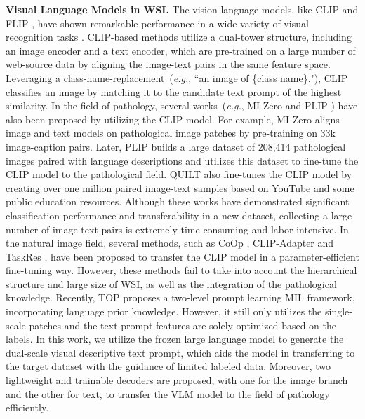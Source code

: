 \noindent\textbf{Visual Language Models in WSI.}
The vision language models, like CLIP \cite{radford2021learning} and FLIP \cite{li2023scaling}, have shown remarkable performance in a wide variety of visual recognition tasks \cite{li2022blip, yu2023task, guo2023texts, khattak2023maple, lin2023clip, han20232vpt}. 
CLIP-based methods utilize a dual-tower structure, including an image encoder and a text encoder, which are pre-trained on a large number of web-source data by aligning the image-text pairs in the same feature space. 
Leveraging a class-name-replacement~(\textit{e.g.}, ``an image of \{class name\}."), CLIP classifies an image by matching it to the candidate text prompt of the highest similarity. 
In the field of pathology, several works~(\textit{e.g.}, MI-Zero \cite{lu2023visual} and PLIP \cite{huang2023visual}) have also been proposed by utilizing the CLIP model. 
For example, MI-Zero \cite{lu2023visual} aligns image and text models on pathological image patches by pre-training on 33k image-caption pairs. 
Later, PLIP \cite{huang2023visual} builds a large dataset of 208,414 pathological images paired with language descriptions and utilizes this dataset to fine-tune the CLIP model to the pathological field. 
QUILT \cite{ikezogwo2023quilt} also fine-tunes the CLIP model by creating over one million paired image-text samples based on YouTube and some public education resources.
Although these works \cite{lu2021data, huang2023visual, zhang2023text} have demonstrated significant classification performance and transferability in a new dataset, collecting a large number of image-text pairs is extremely time-consuming and labor-intensive. 
In the natural image field, several methods, such as CoOp \cite{zhou2022learning}, CLIP-Adapter \cite{gao2023clip} and TaskRes \cite{yu2023task}, have been proposed to transfer the CLIP model in a parameter-efficient fine-tuning way. However, these methods \cite{zhou2022learning, gao2023clip, yu2023task, guo2023texts} fail to take into account the hierarchical structure and large size of WSI, as well as the integration of the pathological knowledge.  
Recently, TOP \cite{qu2024rise} proposes a two-level prompt learning MIL framework, incorporating language prior knowledge. However, it still only utilizes the single-scale patches and the text prompt features are solely optimized based on the labels.
In this work, we utilize the frozen large language model to generate the dual-scale visual descriptive text prompt, which aids the model in transferring to the target dataset with the guidance of limited labeled data. Moreover, two lightweight and trainable decoders are proposed, with one for the image branch and the other for text, to transfer the VLM model to the field of pathology efficiently.

